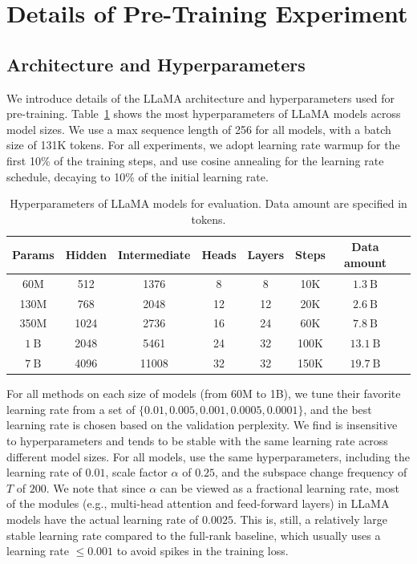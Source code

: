 \newpage
\section{Details of Pre-Training Experiment}


\subsection{Architecture and Hyperparameters}
We introduce details of the LLaMA architecture and hyperparameters used for pre-training. 
Table~\ref{tab:llama_hyperparameters} shows the most hyperparameters of LLaMA models across model sizes. 
We use a max sequence length of 256 for all models, with a batch size of 131K tokens.
For all experiments, we adopt learning rate warmup for the first 10\% of the training steps, and use cosine annealing for the learning rate schedule, decaying to 10\% of the initial learning rate.


\begin{table}[h]
    \caption{Hyperparameters of LLaMA models for evaluation. Data amount are specified in tokens.}
    \label{tab:llama_hyperparameters}
    \vskip 0.15in
    \begin{center}
    \begin{tabular}{cccccccc}
    \toprule
    Params & Hidden & Intermediate & Heads & Layers & Steps & Data amount \\
    \midrule
    60M & 512 & 1376 & 8 & 8  & 10K & $1.3 \mathrm{~B}$ \\
    130M & 768 & 2048 & 12 & 12  & 20K & $2.6 \mathrm{~B}$ \\
    350M & 1024 & 2736 & 16 & 24  & 60K & $7.8 \mathrm{~B}$ \\
    $1 \mathrm{~B}$ & 2048 & 5461 & 24 & 32 & 100K & $13.1 \mathrm{~B}$ \\
    $7 \mathrm{~B}$ & 4096 & 11008 & 32 & 32 & 150K & $19.7 \mathrm{~B}$ \\
    \bottomrule
    \end{tabular}
    \end{center}
    \vskip -0.1in
\end{table}

For all methods on each size of models (from 60M to 1B), we tune their favorite learning rate from a set of $\{0.01, 0.005, 0.001, 0.0005, 0.0001\}$, and the best learning rate is chosen based on the validation perplexity.
We find \lowrank{} is insensitive to hyperparameters and tends to be stable with the same learning rate across different model sizes.
For all models, \lowrank{} use the same hyperparameters, including the learning rate of $0.01$, scale factor $\alpha$ of $0.25$, and the subspace change frequency of $T$ of $200$. We note that since $\alpha$ can be viewed as a fractional learning rate, most of the modules (e.g., multi-head attention and feed-forward layers) in LLaMA models have the actual learning rate of $0.0025$.
This is, still, a relatively large stable learning rate compared to the full-rank baseline, which usually uses a learning rate $\leq 0.001$ to avoid spikes in the training loss.




